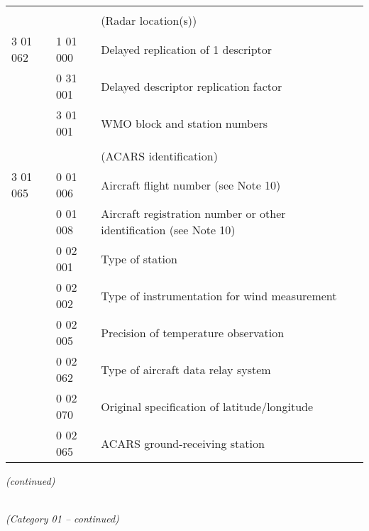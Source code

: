 \begin{longtable}[]{@{}llll@{}}
& & &\tabularnewline
& & (Radar location(s)) &\tabularnewline
3 01 062 & 1 01 000 & Delayed replication of 1 descriptor &\tabularnewline
& 0 31 001 & Delayed descriptor replication factor &\tabularnewline
& 3 01 001 & WMO block and station numbers &\tabularnewline
& & &\tabularnewline
& & (ACARS identification) &\tabularnewline
3 01 065 & 0 01 006 & Aircraft flight number (see Note 10) &\tabularnewline
& 0 01 008 & Aircraft registration number or other identification (see Note 10) &\tabularnewline
& 0 02 001 & Type of station &\tabularnewline
& 0 02 002 & Type of instrumentation for wind measurement &\tabularnewline
& 0 02 005 & Precision of temperature observation &\tabularnewline
& 0 02 062 & Type of aircraft data relay system &\tabularnewline
& 0 02 070 & Original specification of latitude/longitude &\tabularnewline
& 0 02 065 & ACARS ground-receiving station &\tabularnewline
\bottomrule
\end{longtable}

\emph{(continued)}

\emph{\\
(Category 01 -- continued)}

